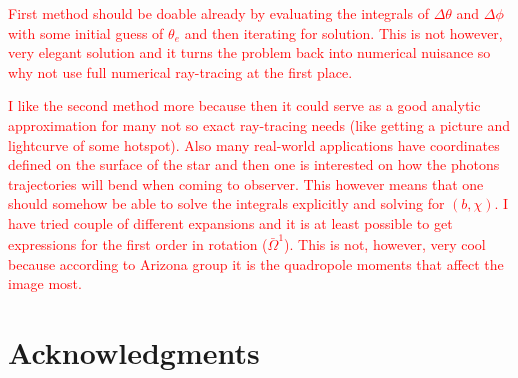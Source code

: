 \documentclass[iop, usenatbib]{emulateapj}
\newcommand{\red}[1]{\textcolor{red}{#1}}
\newcommand{\Ob}{\ensuremath{\bar{\Omega}}}
\begin{document}
\red{
First method should be doable already by evaluating the integrals of $\Delta\theta$ and $\Delta\phi$ with some initial guess of $\theta_e$ and then iterating for solution.
This is not however, very elegant solution and it turns the problem back into numerical nuisance so why not use full numerical ray-tracing at the first place.
}

\red{
I like the second method more because then it could serve as a good analytic approximation for many not so exact ray-tracing needs (like getting a picture and lightcurve of some hotspot).
Also many real-world applications have coordinates defined on the surface of the star and then one is interested on how the photons trajectories will bend when coming to observer.
This however means that one should somehow be able to solve the integrals explicitly and solving for $(b, \chi)$.
I have tried couple of different expansions and it is at least possible to get expressions for the first order in rotation ($\Ob^1$).
This is not, however, very cool because according to Arizona group it is the quadropole moments that affect the image most.
}


\section*{Acknowledgments}




\end{document}
